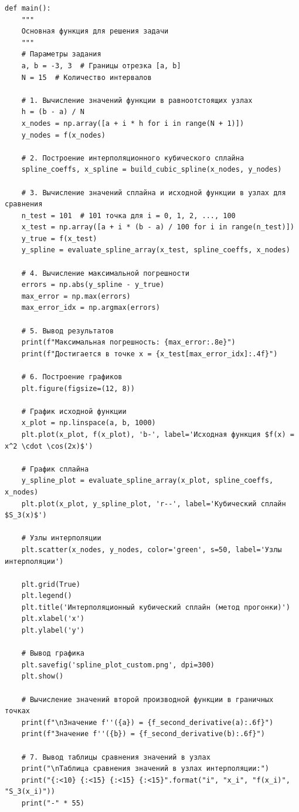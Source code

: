 \documentclass[12pt]{article}
\begin{document}
\begin{verbatim}
def main():
    """
    Основная функция для решения задачи
    """
    # Параметры задания
    a, b = -3, 3  # Границы отрезка [a, b]
    N = 15  # Количество интервалов
    
    # 1. Вычисление значений функции в равноотстоящих узлах
    h = (b - a) / N
    x_nodes = np.array([a + i * h for i in range(N + 1)])
    y_nodes = f(x_nodes)
    
    # 2. Построение интерполяционного кубического сплайна
    spline_coeffs, x_spline = build_cubic_spline(x_nodes, y_nodes)
    
    # 3. Вычисление значений сплайна и исходной функции в узлах для сравнения
    n_test = 101  # 101 точка для i = 0, 1, 2, ..., 100
    x_test = np.array([a + i * (b - a) / 100 for i in range(n_test)])
    y_true = f(x_test)
    y_spline = evaluate_spline_array(x_test, spline_coeffs, x_nodes)
    
    # 4. Вычисление максимальной погрешности
    errors = np.abs(y_spline - y_true)
    max_error = np.max(errors)
    max_error_idx = np.argmax(errors)
    
    # 5. Вывод результатов
    print(f"Максимальная погрешность: {max_error:.8e}")
    print(f"Достигается в точке x = {x_test[max_error_idx]:.4f}")
    
    # 6. Построение графиков
    plt.figure(figsize=(12, 8))
    
    # График исходной функции
    x_plot = np.linspace(a, b, 1000)
    plt.plot(x_plot, f(x_plot), 'b-', label='Исходная функция $f(x) = x^2 \cdot \cos(2x)$')
    
    # График сплайна
    y_spline_plot = evaluate_spline_array(x_plot, spline_coeffs, x_nodes)
    plt.plot(x_plot, y_spline_plot, 'r--', label='Кубический сплайн $S_3(x)$')
    
    # Узлы интерполяции
    plt.scatter(x_nodes, y_nodes, color='green', s=50, label='Узлы интерполяции')
    
    plt.grid(True)
    plt.legend()
    plt.title('Интерполяционный кубический сплайн (метод прогонки)')
    plt.xlabel('x')
    plt.ylabel('y')
    
    # Вывод графика
    plt.savefig('spline_plot_custom.png', dpi=300)
    plt.show()
    
    # Вычисление значений второй производной функции в граничных точках
    print(f"\nЗначение f''({a}) = {f_second_derivative(a):.6f}")
    print(f"Значение f''({b}) = {f_second_derivative(b):.6f}")
    
    # 7. Вывод таблицы сравнения значений в узлах
    print("\nТаблица сравнения значений в узлах интерполяции:")
    print("{:<10} {:<15} {:<15} {:<15}".format("i", "x_i", "f(x_i)", "S_3(x_i)"))
    print("-" * 55)
    

\end{verbatim}
\end{document}

